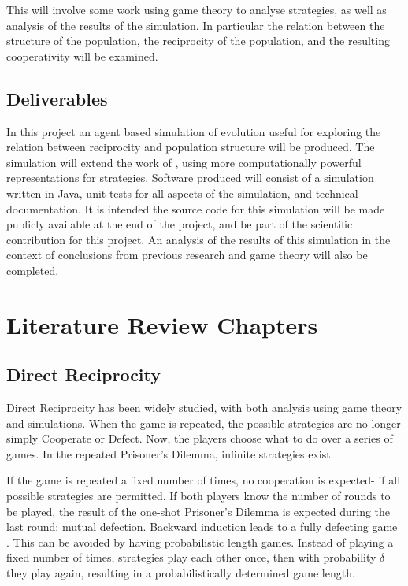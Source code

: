\documentclass[a4paper,11pt,bcshonoursthesis,singlespace,twoside]{cssethesis}
\begin{document}
This will involve some work using game theory to analyse strategies, as well as analysis of the results of the simulation. 
In particular the relation between the structure of the population, the reciprocity of the population, and the resulting cooperativity will be examined. 
\section{Deliverables}
In this project an agent based simulation of evolution useful for exploring the relation between reciprocity and population structure will be produced. 
The simulation will extend the work of \citet{van-veelen:PNAS:2012}, using more computationally powerful representations for strategies. 
Software produced will consist of a simulation written in Java, unit tests for all aspects of the simulation, and technical documentation. 
It is intended the source code for this simulation will be made publicly available at the end of the project, and be part of the scientific contribution for this project. 
An analysis of the results of this simulation in the context of conclusions from previous research and game theory will also be completed. 
\chapter{Literature Review Chapters}

\section{Direct Reciprocity}
\label{sec:dr}
Direct Reciprocity has been widely studied, with both analysis using game theory and simulations. 
When the game is repeated, the possible strategies are no longer simply Cooperate or Defect. 
Now, the players choose what to do over a series of games. 
In the repeated Prisoner's Dilemma, infinite strategies exist.

If the game is repeated a fixed number of times, no cooperation is expected- if all possible strategies are permitted. If both players know the number of rounds to be played, the result of the one-shot Prisoner's Dilemma is expected during the last round: mutual defection. Backward induction leads to a fully defecting game \citep{aumann1995backward}. This can be avoided by having probabilistic length games. 
Instead of playing a fixed number of times, strategies play each other once, then with probability $\delta$ they play again, resulting in a probabilistically determined game length. 
\end{document}
